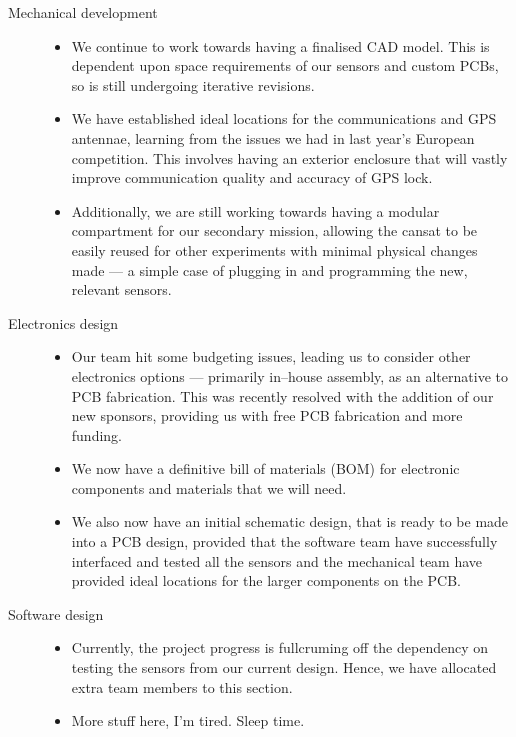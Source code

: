 \documentclass{report}
\begin{document}
\begin{description}
		\item[Mechanical development] \hfill \begin{itemize}
			\item We continue to work towards having a finalised 
			CAD model. This is dependent upon space requirements of
			our sensors and custom PCBs, so is still undergoing iterative
			revisions.
			\item We have established ideal locations for the communications 
			and GPS antennae, learning from the issues we had in last year's
			European competition. This involves having an exterior 
			enclosure that will vastly improve communication quality and
			accuracy of GPS lock.
			\item Additionally, we are still working towards having a modular
			compartment for our secondary mission, allowing the cansat to
			be easily reused for other experiments with minimal physical
			changes made --- a simple case of plugging in and programming
			the new, relevant sensors.
		\end{itemize}

		\item[Electronics design] \hfill \begin{itemize}
			\item Our team hit some budgeting issues, leading us to
			consider other electronics options --- primarily in--house 
			assembly, as an alternative to PCB fabrication. This was recently
			resolved with the addition of our new sponsors, providing us
			with free PCB fabrication and more funding.
			\item We now have a definitive bill of materials (BOM) for 
			electronic components and materials that we will need.
			\item We also now have an initial schematic design, that is 
			ready to be made into a PCB design, provided that the software
			team have successfully interfaced and tested all the sensors and
			the mechanical team have provided ideal locations for the larger
			components on the PCB.
		\end{itemize}

		\item[Software design] \hfill \begin{itemize}
			\item Currently, the project progress is fullcruming off the
			dependency on testing the sensors from our current design.
			Hence, we have allocated extra team members to this section.
			\item More stuff here, I'm tired. Sleep time.
		\end{itemize}

	\end{description}
		
\end{document}
